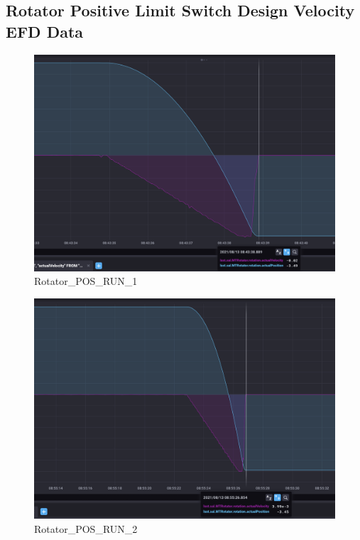 \documentclass[SE,lsstdraft,authoryear,toc]{lsstdoc}
\begin{document}
\subsection{Rotator Positive Limit Switch Design Velocity EFD Data}
\begin{figure}
  \includegraphics[width=\linewidth]{media/rotator_pos_1.png}
  \caption{Rotator\_POS\_RUN\_1}
  \label{fig:Rotator_POS_RUN_1}
\end{figure}

\begin{figure}
  \includegraphics[width=\linewidth]{media/rotator_pos_2.png}
  \caption{Rotator\_POS\_RUN\_2}
  \label{fig:Rotator_POS_RUN_2}
\end{figure}
\end{document}
